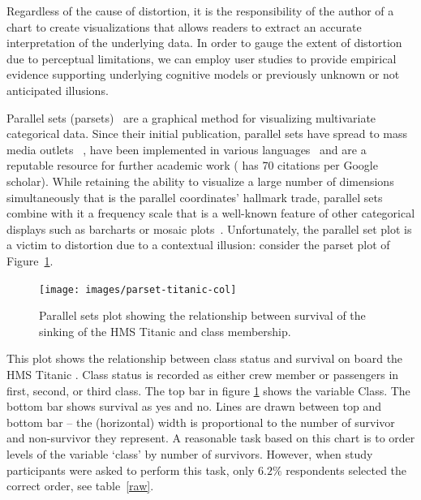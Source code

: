 \documentclass[journal]{vgtc}\usepackage{graphicx, color}
\begin{document}
Regardless of the cause of distortion, it is the responsibility of the  author of a chart to create visualizations that
 allows readers to extract an accurate interpretation of the underlying data.  In order to gauge the
extent of distortion due to perceptual limitations, we can employ user studies   to provide empirical evidence supporting 
underlying cognitive models or previously unknown or not anticipated illusions.




Parallel sets (parsets)~\cite{kosara:2006} are a graphical method  for visualizing multivariate categorical data. Since their initial publication, parallel sets have spread to mass media outlets ~\cite{eagereyes, bostock:2012, bbc:2009}, have been implemented in various languages~\cite{eagereyes, d3, davies} and are a reputable resource for further academic work (\cite{kosara:2006} has 70 citations per Google scholar). While retaining the %
ability to visualize a large number of dimensions simultaneously that is the parallel coordinates' hallmark trade, parallel sets combine with it a frequency scale that is a well-known feature of other categorical displays such as barcharts or mosaic plots~\cite{hartigan:1981, friendly:1992, hofmann:2000, theus:1997}.
Unfortunately, the parallel set plot is a victim to distortion due to a contextual illusion: consider the parset plot of Figure~\ref{question1a}.
%


%
%
\begin{figure}[hbtp]
\centering


{\centering \texttt{[image: images/parset-titanic-col]} 

}




\caption{\label{question1a} Parallel sets plot showing the relationship between survival of the sinking of the HMS Titanic and class membership. }
\end{figure}
%
This plot shows the relationship between class status and survival on board the HMS Titanic  \cite{dawson:1995}. Class status is recorded as either crew member or passengers in  first, second, or third class.  The top bar in figure \ref{question1a} shows the  variable Class. The bottom bar shows survival  as yes and no.
 Lines are drawn between top and bottom bar -- the  (horizontal) width is proportional to the number of survivor and non-survivor they represent. 
 A reasonable task based on this chart is to order levels of the variable `class' by number of survivors. However, when study participants were asked to perform this task, only $6.2\%$ respondents 
selected the correct order, see table~\ref{raw}.
\end{document}
